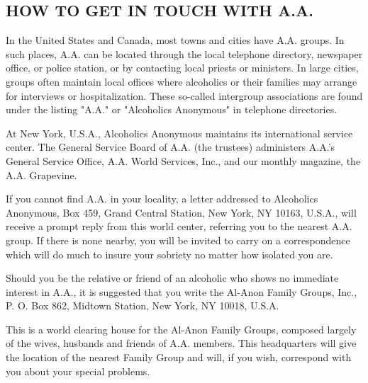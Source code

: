 
\subsection*{HOW TO GET IN TOUCH WITH A.A.}

\begin{biblechapter}
    In the United States and Canada, 
    most towns and cities have A.A. groups.
\verse In such places, 
    A.A. can be located through the local telephone directory, 
    newspaper office,
    or police station, 
    or by contacting local priests or ministers.
\verse In large cities, 
    groups often maintain local offices 
    where alcoholics or their families 
    may arrange for interviews or hospitalization.
\verse These so-called intergroup associations are found under the listing 
    "A.A." or "Alcoholics Anonymous" in telephone directories.

    At New York, U.S.A., 
    Alcoholics Anonymous maintains its international service center.
\verse The General Service Board of A.A. (the trustees) 
    administers A.A.'s General Service Office, A.A. World Services, Inc., 
    and our monthly magazine, the A.A. Grapevine.

\verse If you cannot find A.A. in your locality, 
    a letter addressed to Alcoholics Anonymous, 
    Box 459, Grand Central Station, New York, NY 10163, U.S.A., 
    will receive a prompt reply from this world center, 
    referring you to the nearest A.A. group.
\verse If there is none nearby, 
    you will be invited to carry on a correspondence 
    which will do much to insure your sobriety 
    no matter how isolated you are.

    Should you be the relative or friend of an alcoholic 
    who shows no immediate interest in A.A., 
    it is suggested that you write the Al-Anon Family Groups, Inc., 
    P. O. Box 862, Midtown Station, New York, NY 10018, U.S.A.

\verse This is a world clearing house for the Al-Anon Family Groups, 
    composed largely of the wives, husbands and friends of A.A. members.
\verse This headquarters will give the location of the nearest Family Group 
    and will, if you wish, correspond with you about your special problems.
\end{biblechapter}
